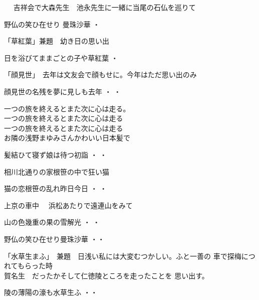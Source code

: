 　
吉祥会で大森先生　池永先生に一緒に当尾の石仏を巡りて　

\begin{shiika}
野仏の笑ひ在せり 曼珠沙華\hfill {  ・  }
\end{shiika}
\vspace{0.6cm}
「草紅葉」兼題　幼き日の思い出　
\begin{shiika}
 日を浴びてままごとの子や草紅葉\hfill {  ・  }
\end{shiika}
\vspace{0.6cm}
「顔見世」　去年は文友会で顔もせに。今年はただ思い出のみ
\begin{shiika}
顔見世の名残を夢に見しも去年\hfill {  ・  ・}
\end{shiika}
\vspace{0.5cm}\qquad\qquad
一つの旅を終えるとまた次に心は走る。\\
\qquad\qquad 一つの旅を終えるとまた次に心は走る\\
\qquad\qquad 一つの旅を終えるとまた次に心は走る\\

\vspace{0.6cm}
お隣の浅野まゆみさんかわいい日本髪で
\begin{shiika}
髪結ひて寝ず娘は待つ初詣\hfill {  ・  ・}
\end{shiika}
\vspace{0.6cm}
相川北通りの家根笹の中で狂い猫
\begin{shiika}
猫の恋根笹の乱れ昨日今日\hfill {  ・  ・}
\end{shiika}
\vspace{0.6cm}
上京の車中　
浜松あたりで遠連山をみて
\begin{shiika}
山の色幾重の果の雪解光\hfill {  ・  ・ }	
\end{shiika}
\vspace{0.6cm}
\begin{shiika}野仏の笑ひ在せり曼珠沙華
\hfill{・・}\end{shiika}
\vspace{0.6cm}
「水草生まふ」　兼題　日浅い私には大変むつかしい。ふと一善の
車で探梅につれてもらった時\\賀名生　だったかそして仁徳陵ところを走ったことを
思い出す。
\begin{shiika}陵の薄陽の濠も水草生ふ
\hfill{・・}\end{shiika}



